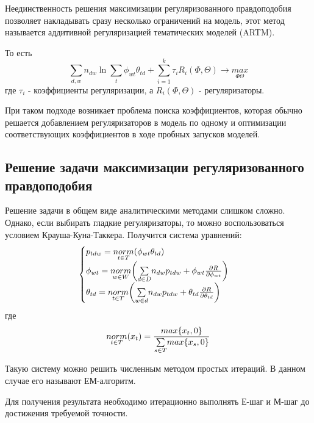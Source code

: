 Неединственность решения максимизации регуляризованного правдоподобия позволяет накладывать сразу несколько ограничений на модель, этот метод называется аддитивной регуляризацией тематических моделей (ARTM).

То есть
\begin{equation}
\sum_{d,w}{n_{dw} \ln{\sum_t\phi_{wt} \theta_{td}}} + \sum_{i=1}^k \tau_i R_i(\Phi,\Theta) \rightarrow \underset{\Phi\Theta}{max}
\end{equation}
где $\tau_i$ - коэффициенты регуляризации, а $R_i(\Phi,\Theta)$ - регуляризаторы.

При таком подходе возникает проблема поиска коэффициентов, которая обычно решается добавлением регуляризаторов в модель по одному и оптимизации соответствующих коэффициентов в ходе пробных запусков моделей.

\subsection{Решение задачи максимизации регуляризованного правдоподобия}

Решение задачи в общем виде аналитическими методами слишком сложно. Однако, если выбирать гладкие регуляризаторы, то можно воспользоваться условием Крауша-Куна-Таккера. Получится система уравнений:
\begin{equation}
\begin{cases}
    p_{tdw} = \underset{t \in T}{norm}(\phi_{wt} \theta_{td}) \\
    \phi_{wt} = \underset{w \in W}{norm}\bigg( \underset{d \in D}\sum{n_{dw} p_{tdw} + \phi_{wt} {{\partial R} \over {\partial \phi_{wt}}}} \bigg) \\
    \theta_{td} = \underset{t \in T}{norm}\bigg( \underset{w \in d}\sum{n_{dw} p_{tdw} + \theta_{td} {{\partial R} \over {\partial \theta_{td}}}} \bigg) \\
\end{cases}
\end{equation}
где
\begin{equation}
\underset{t \in T}{norm}(x_t) = {{max\{ x_t, 0 \}} \over {\underset{s \in T}\sum{ max\{ x_s, 0 \}} }}
\end{equation}

Такую систему можно решить численным методом простых итераций. В данном случае его называют  ЕМ-алгоритм.

Для получения результата необходимо итерационно выполнять Е-шаг и М-шаг до достижения требуемой точности.

